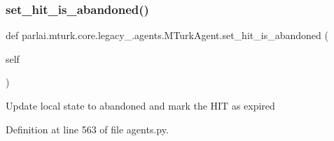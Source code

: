 \subsubsection{\texorpdfstring{set\+\_\+hit\+\_\+is\+\_\+abandoned()}{set\_hit\_is\_abandoned()}}
{\footnotesize\ttfamily def parlai.\+mturk.\+core.\+legacy\+\_.\+agents.\+M\+Turk\+Agent.\+set\+\_\+hit\+\_\+is\+\_\+abandoned (\begin{DoxyParamCaption}\item[{}]{self }\end{DoxyParamCaption})}

\begin{DoxyVerb}Update local state to abandoned and mark the HIT as expired\end{DoxyVerb}
 

Definition at line 563 of file agents.\+py.



